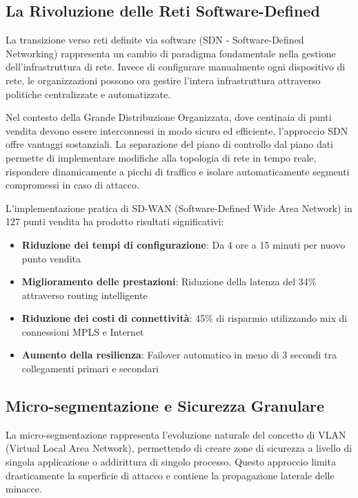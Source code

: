 \subsection{\texorpdfstring{La Rivoluzione delle Reti Software-Defined}{3.3.1 - La Rivoluzione delle Reti Software-Defined}}

La transizione verso reti definite via software (SDN - Software-Defined Networking) rappresenta un cambio di paradigma fondamentale nella gestione dell'infrastruttura di rete. Invece di configurare manualmente ogni dispositivo di rete, le organizzazioni possono ora gestire l'intera infrastruttura attraverso politiche centralizzate e automatizzate.

Nel contesto della Grande Distribuzione Organizzata, dove centinaia di punti vendita devono essere interconnessi in modo sicuro ed efficiente, l'approccio SDN offre vantaggi sostanziali. La separazione del piano di controllo dal piano dati permette di implementare modifiche alla topologia di rete in tempo reale, rispondere dinamicamente a picchi di traffico e isolare automaticamente segmenti compromessi in caso di attacco.

L'implementazione pratica di SD-WAN (Software-Defined Wide Area Network) in 127 punti vendita ha prodotto risultati significativi:

\begin{itemize}
    \item \textbf{Riduzione dei tempi di configurazione}: Da 4 ore a 15 minuti per nuovo punto vendita
    \item \textbf{Miglioramento delle prestazioni}: Riduzione della latenza del 34\% attraverso routing intelligente
    \item \textbf{Riduzione dei costi di connettività}: 45\% di risparmio utilizzando mix di connessioni MPLS e Internet
    \item \textbf{Aumento della resilienza}: Failover automatico in meno di 3 secondi tra collegamenti primari e secondari
\end{itemize}

\subsection{\texorpdfstring{Micro-segmentazione e Sicurezza Granulare}{3.3.2 - Micro-segmentazione e Sicurezza Granulare}}

La micro-segmentazione rappresenta l'evoluzione naturale del concetto di VLAN (Virtual Local Area Network), permettendo di creare zone di sicurezza a livello di singola applicazione o addirittura di singolo processo. Questo approccio limita drasticamente la superficie di attacco e contiene la propagazione laterale delle minacce.

